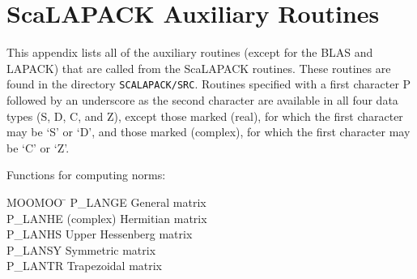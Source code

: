 \documentclass[11pt]{report}
\begin{document}

\chapter{ScaLAPACK Auxiliary Routines}\label{appendixb}

This appendix lists all of the auxiliary routines (except for the
BLAS and LAPACK) that are called from the ScaLAPACK routines. 
These routines are found in the directory {\tt SCALAPACK/SRC}.
Routines specified with a first character P followed by an underscore
as the second character are available in all four data types (S, D, C,
and Z), except those marked (real), for which the first character may
be `S' or `D', and those marked (complex), for which the first character
may be `C' or `Z'.

\noindent
Functions for computing norms:
\begin{tabbing}
MOOMOO \= \kill
P\_LANGE \> General matrix \\
P\_LANHE \> (complex) Hermitian matrix \\
P\_LANHS \> Upper Hessenberg matrix \\
P\_LANSY \> Symmetric matrix \\
P\_LANTR \> Trapezoidal matrix 
\end{tabbing}
\end{document}
